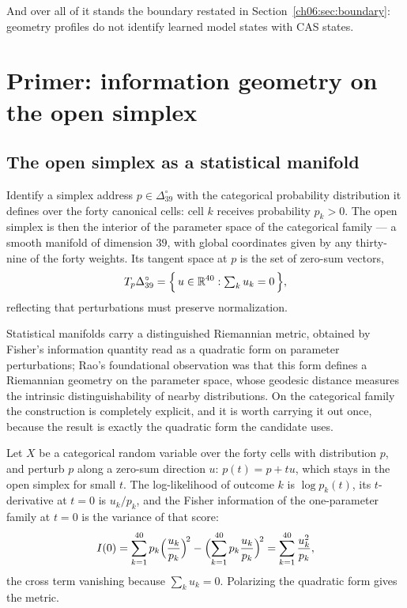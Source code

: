 And over all of it stands the boundary restated in
Section~\ref{ch06:sec:boundary}: geometry profiles do not identify
learned model states with CAS states.

\section{Primer: information geometry on the open simplex}
\label{ch06:sec:primer}

\subsection{The open simplex as a statistical manifold}

Identify a simplex address $p \in \Delta_{39}^{\circ}$ with the
categorical probability distribution it defines over the forty canonical
cells: cell $k$ receives probability $p_k > 0$. The open simplex is then
the interior of the parameter space of the categorical family --- a
smooth manifold of dimension $39$, with global coordinates given by any
thirty-nine of the forty weights. Its tangent space at $p$ is the set of
zero-sum vectors,
\[
T_p \Delta_{39}^{\circ}
 = \Bigl\{\, u \in \mathbb{R}^{40} : \textstyle\sum_k u_k = 0 \,\Bigr\},
\]
reflecting that perturbations must preserve normalization.

Statistical manifolds carry a distinguished Riemannian metric, obtained
by Fisher's information quantity \cite{fisher} read as a quadratic form
on parameter perturbations; Rao's foundational observation \cite{rao}
was that this form defines a Riemannian geometry on the parameter space,
whose geodesic distance measures the intrinsic distinguishability of
nearby distributions. On the categorical family the construction is
completely explicit, and it is worth carrying it out once, because the
result is exactly the quadratic form the candidate uses.

Let $X$ be a categorical random variable over the forty cells with
distribution $p$, and perturb $p$ along a zero-sum direction $u$:
$p(t) = p + t u$, which stays in the open simplex for small $t$. The
log-likelihood of outcome $k$ is $\log p_k(t)$, its $t$-derivative at
$t = 0$ is $u_k / p_k$, and the Fisher information of the
one-parameter family at $t = 0$ is the variance of that score:
\[
I(0)
 = \sum_{k=1}^{40} p_k \Bigl( \frac{u_k}{p_k} \Bigr)^{\!2}
 - \Bigl( \sum_{k=1}^{40} p_k \frac{u_k}{p_k} \Bigr)^{\!2}
 = \sum_{k=1}^{40} \frac{u_k^2}{p_k},
\]
the cross term vanishing because $\sum_k u_k = 0$. Polarizing the
quadratic form gives the metric.

